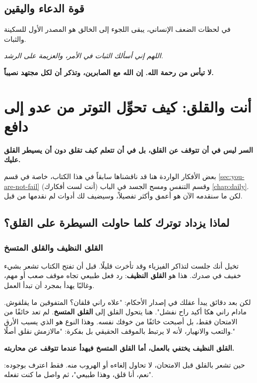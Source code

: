 \documentclass[12pt,a4paper]{book}
\newcommand{\quoteAr}[1]{%
	\begin{myquote}
		\itshape #1
	\end{myquote}
}
\newcommand{\importantAr}[1]{%
	\begin{important}
		\bfseries #1
	\end{important}
}
\begin{document}
	\subsection{قوة الدعاء واليقين}
	في لحظات الضعف الإنساني، يبقى اللجوء إلى الخالق هو المصدر الأول للسكينة والثبات.
	
	\quoteAr{اللهم إني أسألك الثبات في الأمر، والعزيمة على الرشد.}
	
	\importantAr{لا تيأس من رحمة الله. إن الله مع الصابرين، وتذكر أن لكل مجتهد نصيباً.}
	
	
	\section{أنت والقلق: كيف تحوِّل التوتر من عدو إلى دافع}
	\label{sec:worry-trap-section}
	\importantAr{السر ليس في أن تتوقف عن القلق، بل في أن تتعلم كيف تقلق دون أن يسيطر القلق عليك.}
	
	بعض الأفكار الواردة هنا قد ناقشناها سابقاً في هذا الكتاب، خاصة في قسم \ref{sec:you-are-not-fail} (أنت لست أفكارك) وقسم التنفس ومسح الجسد في الباب \ref{chap:daily}. لكن ما سنقدمه الآن هو أعمق وأكثر تفصيلاً، وسيضيف لك أدوات لم نقدمها من قبل.
	
	
	\subsection{لماذا يزداد توترك كلما حاولت السيطرة على القلق؟}
	\label{sec:control-fails}
	
	\subsubsection*{القلق النظيف والقلق المتسخ}
	
	تخيل أنك جلست لتذاكر الفيزياء وقد تأخرت قليلًا. قبل أن تفتح الكتاب تشعر بشيء خفيف في صدرك. هذا هو \textbf{القلق النظيف}: رد فعل طبيعي تجاه موقف صعب أو مهم، وغالبًا يهدأ بمجرد أن تبدأ العمل.
	
	لكن بعد دقائق يبدأ عقلك في إصدار الأحكام: "علاه راني قلقان؟ المتفوقين ما يقلقوش. مادام راني هكا أكيد راح نفشل". هنا يتحول القلق إلى \textbf{القلق المتسخ}. لم تعد خائفًا من الامتحان فقط، بل أصبحت خائفًا من خوفك نفسه. وهذا النوع هو الذي يسبب الأرق والتعب والانهيار، لأنه لا يرتبط بالموقف الحقيقي بل بفكرة: "مالازمش نقلق أصلًا."
	
	\importantAr{القلق النظيف يختفي بالعمل، أما القلق المتسخ فيهدأ عندما تتوقف عن محاربته.}
	
	حين تشعر بالقلق قبل الامتحان، لا تحاول إلغاءه أو الهروب منه. فقط اعترف بوجوده: "نعم، أنا قلق، وهذا طبيعي"، ثم واصل ما كنت تفعله.
	
\end{document}
